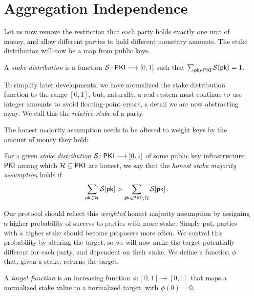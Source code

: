 \section{Aggregation Independence}

Let us now remove the restriction that each party holds exactly one unit of money,
and allow different parties to hold different monetary amounts. The stake distribution
will now be a map from public keys.

\begin{definition}
  A \emph{stake distribution} is a function $\mathcal{S}\colon \mathsf{PKI} \longrightarrow [0, 1]$
  such that $\sum_{\mathsf{pk} \in \mathsf{PKI}} \mathcal{S}(\mathsf{pk}) = 1$.
\end{definition}

To simplify later developments, we have normalized the stake distribution function
to the range $[0, 1]$, but, naturally, a real system must continue to use integer amounts
to avoid floating-point errors, a detail we are now abstracting away. We call this the
\emph{relative stake} of a party.

The honest majority
assumption needs to be altered to weight keys by the amount of money they hold:

\begin{definition}
  For a given \emph{stake distribution} $\mathcal{S}\colon \mathsf{PKI} \longrightarrow [0, 1]$
  of some public key infrastructure $\mathsf{PKI}$ among which $\mathcal{H} \subseteq \mathsf{PKI}$ are honest, we say
  that the \emph{honest stake majority assumption} holds if
  \[
    \sum_{\mathsf{pk} \in \mathcal{H}} \mathcal{S}[\mathsf{pk}] > \sum_{\mathsf{pk} \in \mathsf{PKI} \setminus \mathcal{H}} \mathcal{S}[\mathsf{pk}]\,.
  \]
\end{definition}

Our protocol should reflect this \emph{weighted} honest majority assumption by assigning
a higher probability of success to parties with more stake. Simply put, parties with
a higher stake should become proposers more often. We control this probability by altering
the target, so we will now make the target potentially different for each party, and
dependent on their stake. We define a function $\phi$ that, given a stake, returns
the target.


\begin{definition}
  A \emph{target function} is an increasing function $\phi\colon [0, 1] \longrightarrow [0, 1]$ that maps
  a normalized stake value to a normalized target, with $\phi(0) = 0$.
\end{definition}

